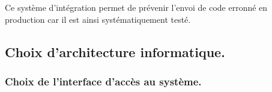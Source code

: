 
\justify

Ce système d'intégration permet de prévenir l'envoi de code erronné en production car il est ainsi systématiquement testé.

\justify
\subsection{Choix d'architecture informatique.}

\subsubsection{Choix de l'interface d'accès au système.}

